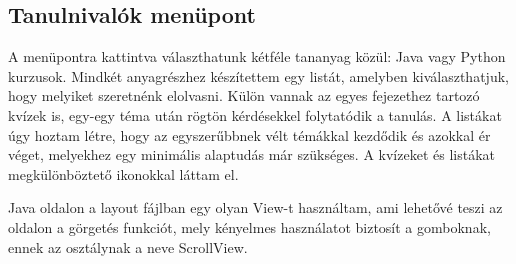 \documentclass{thesis-ekf}
\begin{document}
\subsection{Tanulnivalók menüpont}
A menüpontra kattintva választhatunk kétféle tananyag közül: Java vagy Python kurzusok. Mindkét anyagrészhez készítettem egy listát, amelyben kiválaszthatjuk, hogy melyiket szeretnénk elolvasni. Külön vannak az egyes fejezethez tartozó kvízek is, egy-egy téma után rögtön kérdésekkel folytatódik a tanulás. A listákat úgy hoztam létre, hogy az egyszerűbbnek vélt témákkal kezdődik és azokkal ér véget, melyekhez egy minimális alaptudás már szükséges. A kvízeket és listákat megkülönböztető ikonokkal láttam el.

Java oldalon a layout fájlban egy olyan View-t használtam, ami lehetővé teszi az oldalon a görgetés funkciót, mely kényelmes használatot biztosít a gomboknak, ennek az osztálynak a neve ScrollView.
\end{document}
